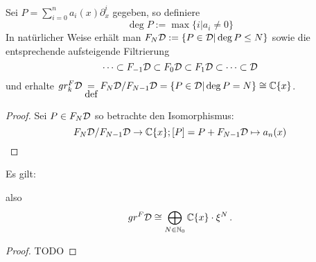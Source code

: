 

\begin{defn}
  Sei $P=\sum_{i=0}^na_i(x)\partial_x^i$ gegeben, so definiere 
  \[
    \deg P:=\max\{i|a_i\neq 0\}
  \]
  In natürlicher Weise erhält man $F_N\mathcal{D}:=\{P\in\mathcal{D}|\deg P\leq N\}$ sowie die
  entsprechende aufsteigende Filtrierung
  \[
    \cdots\subset F_{-1}\mathcal{D}\subset F_{0}\mathcal{D}\subset
    F_{1}\mathcal{D}\subset\cdots\subset\mathcal{D}
  \]
  und erhalte $gr_k^F\mathcal{D}\underset{\mbox{def}}{=}F_N\mathcal{D}\slash F_{N-1}\mathcal{D}
  =\{P\in\mathcal{D}|\deg P=N\}\cong\mathbb{C}\{x\}$.
\end{defn}

\begin{proof}
  Sei $P\in F_N\mathcal{D}$ so betrachte den Isomorphismus:
  \[
    F_N\mathcal{D}\slash F_{N-1}\mathcal{D}\rightarrow \mathbb{C}\{x\}; [P]=P+F_{N-1}\mathcal{D}\mapsto a_n(x)
  \]
\end{proof}

\begin{prop}
  Es gilt:
  \begin{center}
  \end{center}
  also
  \[ gr^F\mathcal{D} \cong \bigoplus_{N\in\mathbb{N}_0}\mathbb{C}\{x\}\cdot \xi^N \,. \]
\end{prop}
\begin{proof} TODO
  \begin{comment}
    Treffen?
  \end{comment}
\end{proof}

\begin{comment}
  \subsection{Weyl Algebra als Graduierter Ring}
  Sei $A$ nun einer der drei Koeffizienten Ringe, welche zuvor behandelt
  wurden.  Der Ring $A<\partial_x>$ kommt zusammen mit einer aufsteigenden
  Filtrierung, welche wir mit $F(A<\partial_x)$ bezeichen werden.  Sei $P$ ein
  bzgl. \ref{prop:weyl_eindeutige_schreibung} minimal geschriebener Operator,
  so ist $P$ in $F_k$ falls der maximale Grad von $\partial_x$ in $P$ kleiner
  oder gleich $k$. So definiere den Grad $deg P$ von $P$ als die Eindeutige
  ganze Zahl $k$ mit $P\in F_kA<\partial_x>\slash F_{k-1}<\partial_x>$

  Unabhängigkeit von Schreibung wird in Sabbah Script behauptet
\end{comment}

